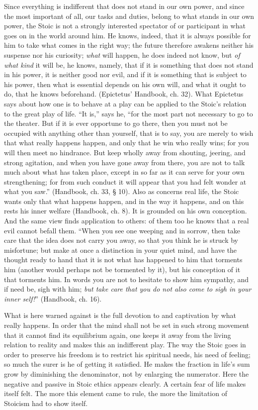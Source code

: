\documentclass[12pt,a4paper,openany]{book}
\newcommand{\opage}[1]{\marginnote{\footnotesize\textit{[#1]}}}
\begin{document}
Since everything is indifferent that does not stand in our own
power, and since the most important of all, our tasks and duties,
belong to what stands in our own power, the Stoic is
not a strongly interested spectator of or participant
in what goes on in the world around him. He knows, indeed,
that it is always possible for him to take what comes in the
right way; the future therefore awakens neither his suspense
nor his curiosity; \emph{what} will happen, he does indeed
not know, but \emph{of what kind} it will be, he knows, namely, that
if it is something that does not stand in his power, it is neither
good nor evil, and if it is something that is subject to his power,
then what is essential depends on his own will, and
what it ought to do, that he knows beforehand. (Epictetus'
Handbook, ch. 32). What Epictetus says about how
one is to behave at a play can be applied to
the Stoic's relation to the great play of life. ``It is,'' says
he, ``for the most part not necessary to go to the theater. But
\opage{177}if it is ever opportune to go there, then you must
not be occupied with anything other than yourself, that is to say,
you are merely to wish that what really happens happen, and only
that he win who really wins; for you will then meet no
hindrance. But keep wholly away from shouting, jeering, and
strong agitation, and when you have gone away from there, you are not to
talk much about what has taken place, except in so far as
it can serve for your own strengthening; for from such conduct
it will appear that you had felt wonder at what you saw.''
(Handbook, ch. 33, § 10). Also as concerns real life,
the Stoic wants only that what happens happen, and
in the way it happens, and on this rests his inner welfare
(Handbook, ch. 8). It is grounded on his own
conception. And the same view finds application to
others: of them too he knows that a real evil
cannot befall them. ``When you see one weeping and in
sorrow, then take care that the idea does not carry you away, so
that you think he is struck by misfortune; but make at once a
distinction in your quiet mind, and have the thought ready to hand that
it is not what has happened to him that torments him (another would
perhaps not be tormented by it), but his conception of it that
torments him. In words you are not to hesitate to show him
sympathy, and if need be, sigh with him; \emph{but take care
that you do not also come to sigh in your inner self!}''
(Handbook, ch. 16).

What is here warned against is the full devotion to
and captivation by what really happens. In order that the mind
shall not be set in such strong movement that it cannot
find its equilibrium again, one keeps it away from the living
relation to reality and makes this an indifferent
play. The way the Stoic goes in order to preserve his freedom is
to restrict his spiritual needs, his
need of feeling; so much the surer is he of getting it satisfied. He
makes the fraction in life's sum grow by
diminishing the denominator, not by enlarging the numerator. Here
the negative and passive in Stoic ethics appears
clearly. A certain fear of life makes itself felt. The more
\opage{178}this element came to rule, the more the limitation of Stoicism had to show itself.
\end{document}
